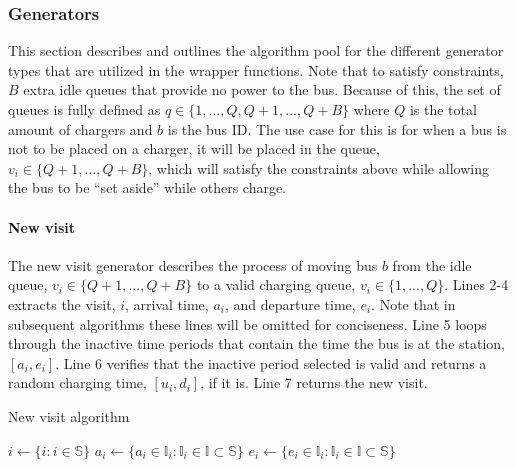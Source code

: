 \documentclass[11pt,a4paper,final]{article}
\newcommand{\I}{\mathbb{I}}                 %
\newcommand{\C}{\mathbb{C}}                 %
\newcommand{\U}{\mathcal{U}}                %
\newcommand{\Sol}{\mathbb{S}}               %
\begin{document}
\subsubsection{Generators}
\label{sec:generators}
This section describes and outlines the algorithm pool for the different generator types that are utilized in the
wrapper functions. Note that to satisfy constraints, \(B\) extra idle queues that provide no power to the bus. Because of
this, the set of queues is fully defined as \(q \in \{1,..., Q, Q+1,..., Q+B\}\) where \(Q\) is the total amount of chargers
and \(b\) is the bus ID. The use case for this is for when a bus is not to be placed on a charger, it will be placed in
the queue, \(v_i \in \{Q+1,..., Q+B\}\), which will satisfy the constraints above while allowing the bus to be ``set aside''
while others charge.

\paragraph{New visit}
\label{new-visit}
The new visit generator describes the process of moving bus \(b\) from the idle queue, \(v_i \in \{Q+1,..., Q+B\}\) to a valid
charging queue, \(v_i \in \{1,..., Q\}\). Lines 2-4 extracts the visit, \(i\), arrival time, \(a_i\), and departure time, \(e_i\).
Note that in subsequent algorithms these lines will be omitted for conciseness. Line 5 loops through the inactive time
periods that contain the time the bus is at the station, \([a_i, e_i]\). Line 6 verifies that the inactive period selected
is valid and returns a random charging time, \([u_i, d_i]\), if it is. Line 7 returns the new visit.

\begin{algorithm}[H]
\caption{New visit algorithm}
    \LinesNumbered
    \KwIn{($\Sol$)}
    \KwOut{$\I_i'$}


    \Begin
    {
        $i    \leftarrow \{i: i \in \Sol \}$ 
        $a_i  \leftarrow \{ a_i \in \I_i : \I_i \in \I \subset \Sol \}$ 
        $e_i  \leftarrow \{ e_i \in \I_i : \I_i \in \I \subset \Sol \}$ 

        \While {$C_q^j \in \{[a_i, e_i]\} \subset \U_{\C}$}
        {
            {
                \Return{$\I_i' \leftarrow x_i'$} 
            }
        }
    }
\label{alg:new-visit}
\end{algorithm}
\end{document}
